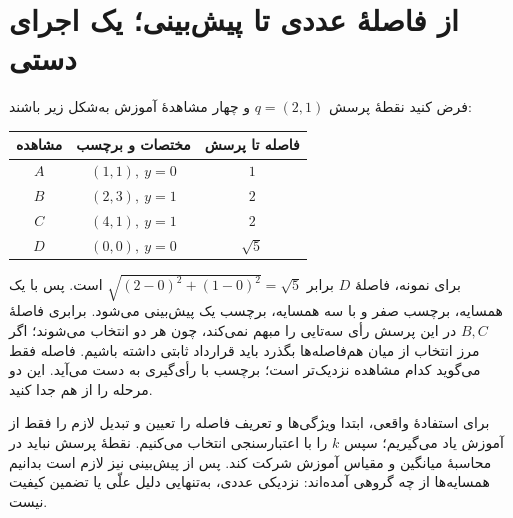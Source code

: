 \section{از فاصلهٔ عددی تا پیش‌بینی؛ یک اجرای دستی}
فرض کنید نقطهٔ پرسش $q=(2,1)$ و چهار مشاهدهٔ آموزش به‌شکل زیر باشند:
\begin{center}
\begin{tabular}{ccc}
\toprule مشاهده & مختصات و برچسب & فاصله تا پرسش\\\midrule
$A$ & $(1,1),\ y=0$ & $1$\\
$B$ & $(2,3),\ y=1$ & $2$\\
$C$ & $(4,1),\ y=1$ & $2$\\
$D$ & $(0,0),\ y=0$ & $\sqrt5$\\\bottomrule
\end{tabular}
\end{center}
برای نمونه، فاصلهٔ $D$ برابر $\sqrt{(2-0)^2+(1-0)^2}=\sqrt5$ است. پس با یک همسایه، برچسب صفر و با سه همسایه، برچسب یک پیش‌بینی می‌شود. برابری فاصلهٔ $B,C$ در این پرسش رأی سه‌تایی را مبهم نمی‌کند، چون هر دو انتخاب می‌شوند؛ اگر مرز انتخاب از میان هم‌فاصله‌ها بگذرد باید قرارداد ثابتی داشته باشیم. فاصله فقط می‌گوید کدام مشاهده نزدیک‌تر است؛ برچسب با رأی‌گیری به دست می‌آید. این دو مرحله را از هم جدا کنید.

برای استفادهٔ واقعی، ابتدا ویژگی‌ها و تعریف فاصله را تعیین و تبدیل لازم را فقط از آموزش یاد می‌گیریم؛ سپس $k$ را با اعتبارسنجی انتخاب می‌کنیم. نقطهٔ پرسش نباید در محاسبهٔ میانگین و مقیاس آموزش شرکت کند. پس از پیش‌بینی نیز لازم است بدانیم همسایه‌ها از چه گروهی آمده‌اند: نزدیکی عددی، به‌تنهایی دلیل علّی یا تضمین کیفیت نیست.

